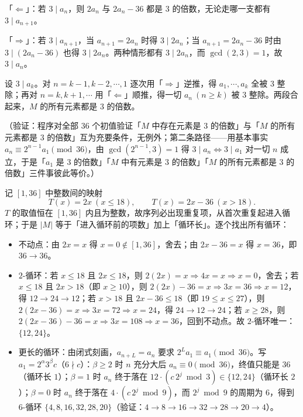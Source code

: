 \begin{answer}
「\(\Leftarrow\)」：若 \(3\mid a_{n}\)，则 \(2a_{n}\) 与 \(2a_{n}-36\) 都是 \(3\) 的倍数，无论走哪一支都有 \(3\mid a_{n+1}\)。

「\(\Rightarrow\)」：若 \(3\mid a_{n+1}\)，当 \(a_{n+1}=2a_{n}\) 时得 \(3\mid2a_{n}\)；当 \(a_{n+1}=2a_{n}-36\) 时由 \(3\mid(2a_{n}-36)\) 也得 \(3\mid2a_{n}\)。两种情形都有 \(3\mid2a_{n}\)，而 \(\gcd(2,3)=1\)，故 \(3\mid a_{n}\)。

设 \(3\mid a_{k}\)。对 \(n=k-1,k-2,\cdots,1\) 逐次用「\(\Rightarrow\)」逆推，得 \(a_{1},\cdots,a_{k}\) 全被 \(3\) 整除；再对 \(n=k,k+1,\cdots\) 用「\(\Leftarrow\)」顺推，得一切 \(a_{n}\ (n\geqslant k)\) 被 \(3\) 整除。两段合起来，\(M\) 的所有元素都是 \(3\) 的倍数。

（验证：程序对全部 \(36\) 个初值验证「\(M\) 中存在元素是 \(3\) 的倍数」与「\(M\) 的所有元素都是 \(3\) 的倍数」互为充要条件，无例外；第二条路径——用基本事实 \(a_{n}\equiv2^{n-1}a_{1}\pmod{36}\)，由 \(\gcd(2^{n-1},3)=1\) 得 \(3\mid a_{n}\iff3\mid a_{1}\) 对一切 \(n\) 成立，于是「\(a_{1}\) 是 \(3\) 的倍数」「\(M\) 中有元素是 \(3\) 的倍数」「\(M\) 的所有元素都是 \(3\) 的倍数」三件事彼此等价。）


记 \([1,36]\) 中整数间的映射
\nopagebreak[4]
\[
T(x)=2x\ (x\leqslant18),\qquad T(x)=2x-36\ (x>18).
\]
\(T\) 的取值恒在 \([1,36]\) 内且为整数，故序列必出现重复项，从首次重复起进入循环；于是 \(|M|\) 等于「进入循环前的项数」加上「循环长」。逐个找出所有循环：

\begin{itemize}
\item 不动点：由 \(2x=x\) 得 \(x=0\notin[1,36]\)，舍去；由 \(2x-36=x\) 得 \(x=36\)，即 \(36\to36\)。
\item \(2\)-循环：若 \(x\leqslant18\) 且 \(2x\leqslant18\)，则 \(2(2x)=x\Rightarrow4x=x\Rightarrow x=0\)，舍去；若 \(x\leqslant18\) 且 \(2x>18\)（即 \(x\geqslant10\)），则 \(2(2x)-36=x\Rightarrow3x=36\Rightarrow x=12\)，得 \(12\to24\to12\)；若 \(x>18\) 且 \(2x-36\leqslant18\)（即 \(19\leqslant x\leqslant27\)），则 \(2(2x-36)=x\Rightarrow3x=72\Rightarrow x=24\)，得 \(24\to12\to24\)；若 \(x\geqslant28\)，则 \(2(2x-36)-36=x\Rightarrow3x=108\Rightarrow x=36\)，回到不动点。故 \(2\)-循环唯一：\(\{12,24\}\)。
\item 更长的循环：由闭式刻画，\(a_{n+L}=a_{n}\) 要求 \(2^{L}a_{1}\equiv a_{1}\pmod{36}\)。写 \(a_{1}=2^{\alpha}3^{\beta}c\)（\(6\nmid c\)）：\(\beta\geqslant2\) 时 \(n\) 充分大后 \(a_{n}\equiv0\pmod{36}\)，终值只能是 \(36\)（循环长 \(1\)）；\(\beta=1\) 时 \(a_{n}\) 终于落在 \(12\cdot(c\,2^{j}\bmod 3)\in\{12,24\}\)（循环长 \(2\)）；\(\beta=0\) 时 \(a_{n}\) 终于落在 \(4\cdot(c\,2^{j}\bmod 9)\)，而 \(2^{j}\bmod 9\) 的周期为 \(6\)，得到 \(6\)-循环 \(\{4,8,16,32,28,20\}\)（验证：\(4\to8\to16\to32\to28\to20\to4\)）。
\end{itemize}


\end{answer}
